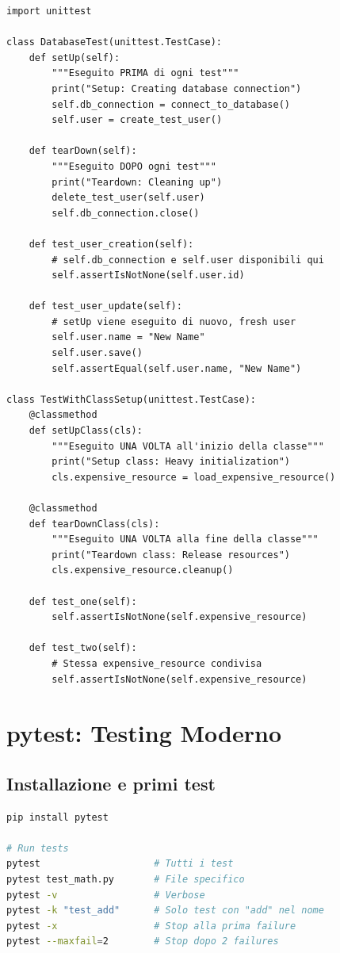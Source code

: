 \begin{lstlisting}
import unittest

class DatabaseTest(unittest.TestCase):
    def setUp(self):
        """Eseguito PRIMA di ogni test"""
        print("Setup: Creating database connection")
        self.db_connection = connect_to_database()
        self.user = create_test_user()

    def tearDown(self):
        """Eseguito DOPO ogni test"""
        print("Teardown: Cleaning up")
        delete_test_user(self.user)
        self.db_connection.close()

    def test_user_creation(self):
        # self.db_connection e self.user disponibili qui
        self.assertIsNotNone(self.user.id)

    def test_user_update(self):
        # setUp viene eseguito di nuovo, fresh user
        self.user.name = "New Name"
        self.user.save()
        self.assertEqual(self.user.name, "New Name")

class TestWithClassSetup(unittest.TestCase):
    @classmethod
    def setUpClass(cls):
        """Eseguito UNA VOLTA all'inizio della classe"""
        print("Setup class: Heavy initialization")
        cls.expensive_resource = load_expensive_resource()

    @classmethod
    def tearDownClass(cls):
        """Eseguito UNA VOLTA alla fine della classe"""
        print("Teardown class: Release resources")
        cls.expensive_resource.cleanup()

    def test_one(self):
        self.assertIsNotNone(self.expensive_resource)

    def test_two(self):
        # Stessa expensive_resource condivisa
        self.assertIsNotNone(self.expensive_resource)
\end{lstlisting}

\section{pytest: Testing Moderno}

\subsection{Installazione e primi test}

\begin{lstlisting}[language=bash]
pip install pytest

# Run tests
pytest                    # Tutti i test
pytest test_math.py       # File specifico
pytest -v                 # Verbose
pytest -k "test_add"      # Solo test con "add" nel nome
pytest -x                 # Stop alla prima failure
pytest --maxfail=2        # Stop dopo 2 failures
\end{lstlisting}

